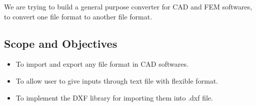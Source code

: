We are trying to build a general purpose converter for CAD and FEM softwares, to convert one file format to another file format.
\subsection{Scope and Objectives}
\begin{itemize}
\item To import and export any file format in CAD softwares.\\

\item To allow user to give inputs through text file with flexible format. \\

\item To implement the DXF library for importing them into .dxf file.\\

\end{itemize}

